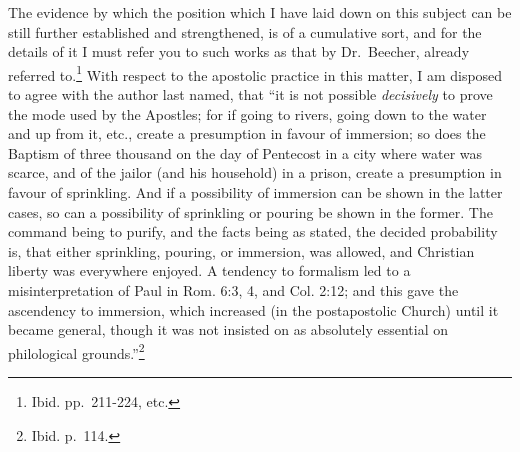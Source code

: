 \documentclass[english,]{book}
\begin{document}
The evidence by which the position which I have laid down on this subject can be still further established and strengthened, is of a cumulative sort, and for the details of it I must refer you to such works as that by Dr.~Beecher, already referred to.\footnote{Ibid. pp.~211-224, etc.} With respect to the apostolic practice in this matter, I am disposed to agree with the author last named, that ``it is not possible \emph{decisively} to prove the mode used by the Apostles; for if going to rivers, going down to the water and up from it, etc., create a presumption in favour of immersion; so does the Baptism of three thousand on the day of Pentecost in a city where water was scarce, and of the jailor (and his household) in a prison, create a presumption in favour of sprinkling. And if a possibility of immersion can be shown in the latter cases, so can a possibility of sprinkling or pouring be shown in the former. The command being to purify, and the facts being as stated, the decided probability is, that either sprinkling, pouring, or immersion, was allowed, and Christian liberty was everywhere enjoyed. A tendency to formalism led to a misinterpretation of Paul in Rom. 6:3, 4, and Col. 2:12; and this gave the ascendency to immersion, which increased (in the postapostolic Church) until it became general, though it was not insisted on as absolutely essential on philological grounds.''\footnote{Ibid. p.~114.}
\end{document}
